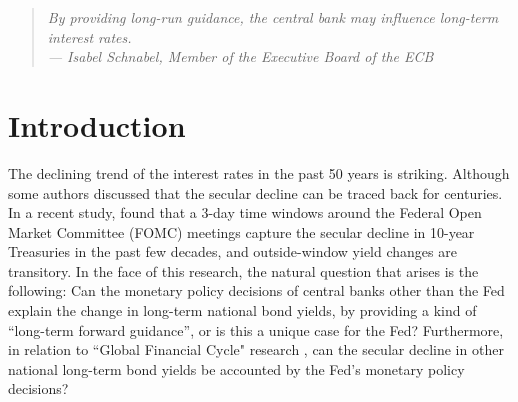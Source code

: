 \begin{quote}
    \itshape
    \setlength{\leftskip}{1cm}
    By providing long-run guidance, the central bank may influence long-term interest rates. \\
    \normalfont
    \hspace*{\fill}--- Isabel Schnabel, Member of the Executive Board of the ECB
\end{quote}

\section{Introduction}

The declining trend of the interest rates in the past 50 years is striking. Although some authors discussed that the secular decline can be traced back for centuries. \citep{rogoff2022} In a recent study, \citet{hillenbrand2022} found that a 3-day time windows around the Federal Open Market Committee (FOMC) meetings capture the secular decline in 10-year Treasuries in the past few decades, and outside-window yield changes are transitory. In the face of this research, the natural question that arises is the following: Can the monetary policy decisions of central banks other than the Fed explain the change in long-term national bond yields, by providing a kind of ``long-term forward guidance'', or is this a unique case for the Fed? Furthermore, in relation to ``Global Financial Cycle" research \citep{miranda2020us, rey2021}, can the secular decline in other national long-term bond yields be accounted by the Fed's monetary policy decisions?